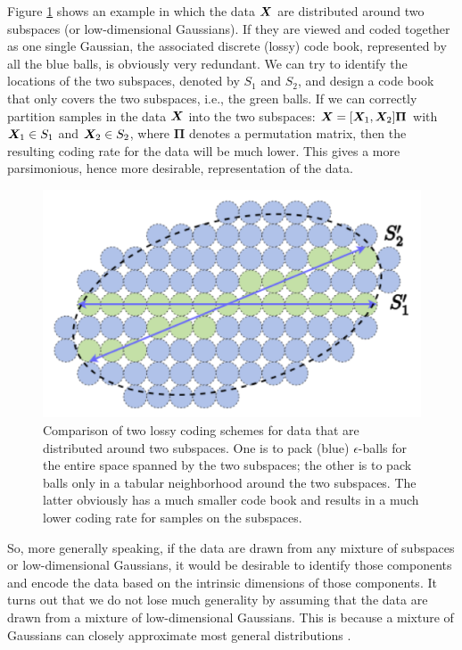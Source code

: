 \documentclass[../../book-main.tex]{subfiles}
\begin{document}
\begin{example}
	Figure \ref{fig:two-subspaces} shows an example in which the data $\bm{X}$ are distributed around two subspaces (or low-dimensional Gaussians). If they are viewed and coded together as one single Gaussian, the associated discrete (lossy) code book, represented by all the blue balls, is obviously very redundant. We can try to identify the locations of the two subspaces, denoted by $S_1$ and $S_2$, and design a code book that only covers the two subspaces, i.e., the green balls. If we can correctly partition samples in the data $\bm{X}$ into the two subspaces: $\bm{X} = [\bm{X}_1, \bm{X}_2]\bm \Pi$ with $\bm{X}_1 \in S_1$ and $\bm{X}_2 \in S_2$, where $\bm \Pi$ denotes a permutation matrix, then the resulting coding rate for the data will be much lower. This gives a more parsimonious, hence more desirable, representation of the data.
\end{example}

\begin{figure}
	\centering
	\includegraphics[width=0.5\linewidth]{chapters/chapter3/figs/Two-subspaces.png}
	\caption{Comparison of two lossy coding schemes for data that are distributed around two subspaces. One is to pack (blue) $\epsilon$-balls for the entire space spanned by the two subspaces; the other is to pack balls only in a tabular neighborhood around the two subspaces. The latter obviously has a much smaller code book and results in a much lower coding rate for samples on the subspaces.}
	\label{fig:two-subspaces}
\end{figure}

So, more generally speaking, if the data are drawn from any mixture of subspaces or low-dimensional Gaussians, it would be desirable to identify those components and encode the data based on the intrinsic dimensions of those components. It turns out that we do not lose much generality by assuming that the data are drawn from a mixture of low-dimensional Gaussians. This is because a mixture of Gaussians can closely approximate most general distributions \cite{borkar2016gaussian}. 
\end{document}
